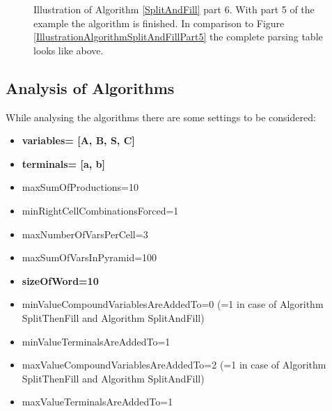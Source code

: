 \begin{figure} [h]
\begin{minipage}{6in}
{
		}
	\end{minipage}
	\caption{Illustration of Algorithm \ref{SplitAndFill} part 6. With part 5 of the example the algorithm is finished. In comparison to Figure \ref{IllustrationAlgorithmSplitAndFillPart5} the complete parsing table looks like above.}
	\label{IllustrationAlgorithmSplitAndFillPart6}
\end{figure}

\clearpage
\pagebreak
\subsection{Analysis of Algorithms} \label{AnalysisOfAlgorithms}
While analysing the algorithms there are some settings to be considered:
\begin{itemize} [noitemsep]
	\item \textbf{variables= [A, B, S, C]}
	\item \textbf{terminals= [a, b]}
	\item maxSumOfProductions=10
	\item minRightCellCombinationsForced=1
	\item maxNumberOfVarsPerCell=3
	\item maxSumOfVarsInPyramid=100
	\item \textbf{sizeOfWord=10}
	\item minValueCompoundVariablesAreAddedTo=0 (=1 in case of Algorithm SplitThenFill and Algorithm SplitAndFill) 
	\item minValueTerminalsAreAddedTo=1
	\item maxValueCompoundVariablesAreAddedTo=2 (=1 in case of Algorithm SplitThenFill and Algorithm SplitAndFill) 
	\item maxValueTerminalsAreAddedTo=1
\end{itemize} 

